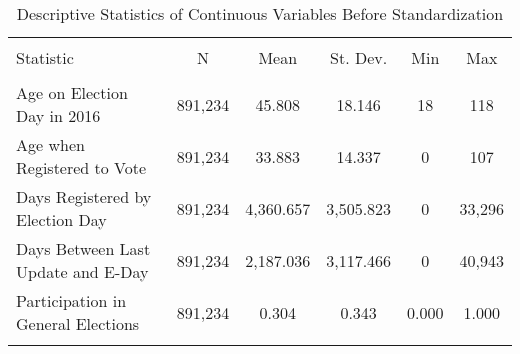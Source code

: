 
\begin{table}[!htbp] \centering 
  \caption{Descriptive Statistics of Continuous Variables Before Standardization} 
  \label{fveunscaledstats} 
\small 
\begin{tabular}{@{\extracolsep{5pt}}lccccc} 
\\[-1.8ex]\hline 
\hline \\[-1.8ex] 
Statistic & \multicolumn{1}{c}{N} & \multicolumn{1}{c}{Mean} & \multicolumn{1}{c}{St. Dev.} & \multicolumn{1}{c}{Min} & \multicolumn{1}{c}{Max} \\ 
\hline \\[-1.8ex] 
Age on Election Day in 2016 & 891,234 & 45.808 & 18.146 & 18 & 118 \\ 
Age when Registered to Vote & 891,234 & 33.883 & 14.337 & 0 & 107 \\ 
Days Registered by Election Day & 891,234 & 4,360.657 & 3,505.823 & 0 & 33,296 \\ 
Days Between Last Update and E-Day & 891,234 & 2,187.036 & 3,117.466 & 0 & 40,943 \\ 
Participation in General Elections & 891,234 & 0.304 & 0.343 & 0.000 & 1.000 \\ 
\hline \\[-1.8ex] 
\end{tabular} 
\end{table} 
